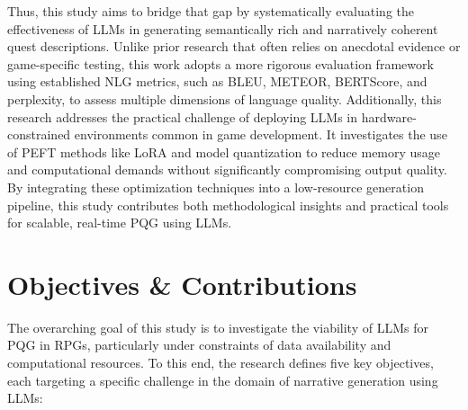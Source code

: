 Thus, this study aims to bridge that gap by systematically evaluating the effectiveness
of LLMs in generating semantically rich and narratively coherent quest descriptions.
Unlike prior research that often relies on anecdotal evidence or game-specific testing, this
work adopts a more rigorous evaluation framework using established NLG metrics, such
as BLEU, METEOR, BERTScore, and perplexity, to assess multiple dimensions of language
quality. Additionally, this research addresses the practical challenge of deploying
LLMs in hardware-constrained environments common in game development. It investigates
the use of PEFT methods like LoRA and model quantization to reduce memory
usage and computational demands without significantly compromising output quality.
By integrating these optimization techniques into a low-resource generation pipeline, this
study contributes both methodological insights and practical tools for scalable, real-time
PQG using LLMs.

\section{Objectives \& Contributions}

The overarching goal of this study is to investigate the viability of LLMs for PQG in RPGs, particularly under constraints of data availability and computational resources. To this end, the research defines five key objectives, each targeting a specific challenge in the domain of narrative generation using LLMs:

